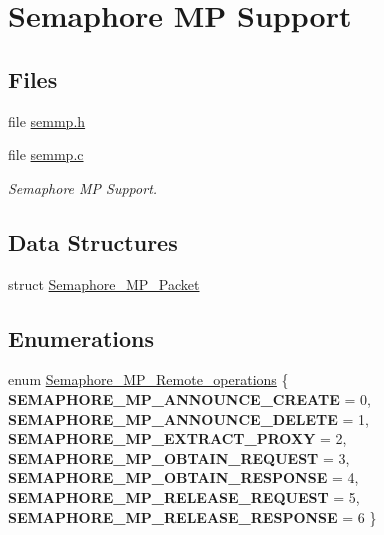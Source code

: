 \hypertarget{group__ClassicSEM}{}\section{Semaphore MP Support}
\label{group__ClassicSEM}
\subsection*{Files}
\begin{DoxyCompactItemize}
\item 
file \mbox{\hyperlink{semmp_8h}{semmp.\+h}}
\item 
file \mbox{\hyperlink{semmp_8c}{semmp.\+c}}
\begin{DoxyCompactList}\small\item\em Semaphore MP Support. \end{DoxyCompactList}\end{DoxyCompactItemize}
\subsection*{Data Structures}
\begin{DoxyCompactItemize}
\item 
struct \mbox{\hyperlink{structSemaphore__MP__Packet}{Semaphore\+\_\+\+M\+P\+\_\+\+Packet}}
\end{DoxyCompactItemize}
\subsection*{Enumerations}
\begin{DoxyCompactItemize}
\item 
enum \mbox{\hyperlink{group__ClassicSEM_ga24fc0fecc46118303c1de1742a2c5adf}{Semaphore\+\_\+\+M\+P\+\_\+\+Remote\+\_\+operations}} \{ \newline
{\bfseries S\+E\+M\+A\+P\+H\+O\+R\+E\+\_\+\+M\+P\+\_\+\+A\+N\+N\+O\+U\+N\+C\+E\+\_\+\+C\+R\+E\+A\+TE} = 0, 
{\bfseries S\+E\+M\+A\+P\+H\+O\+R\+E\+\_\+\+M\+P\+\_\+\+A\+N\+N\+O\+U\+N\+C\+E\+\_\+\+D\+E\+L\+E\+TE} = 1, 
{\bfseries S\+E\+M\+A\+P\+H\+O\+R\+E\+\_\+\+M\+P\+\_\+\+E\+X\+T\+R\+A\+C\+T\+\_\+\+P\+R\+O\+XY} = 2, 
{\bfseries S\+E\+M\+A\+P\+H\+O\+R\+E\+\_\+\+M\+P\+\_\+\+O\+B\+T\+A\+I\+N\+\_\+\+R\+E\+Q\+U\+E\+ST} = 3, 
\newline
{\bfseries S\+E\+M\+A\+P\+H\+O\+R\+E\+\_\+\+M\+P\+\_\+\+O\+B\+T\+A\+I\+N\+\_\+\+R\+E\+S\+P\+O\+N\+SE} = 4, 
{\bfseries S\+E\+M\+A\+P\+H\+O\+R\+E\+\_\+\+M\+P\+\_\+\+R\+E\+L\+E\+A\+S\+E\+\_\+\+R\+E\+Q\+U\+E\+ST} = 5, 
{\bfseries S\+E\+M\+A\+P\+H\+O\+R\+E\+\_\+\+M\+P\+\_\+\+R\+E\+L\+E\+A\+S\+E\+\_\+\+R\+E\+S\+P\+O\+N\+SE} = 6
 \}
\end{DoxyCompactItemize}

